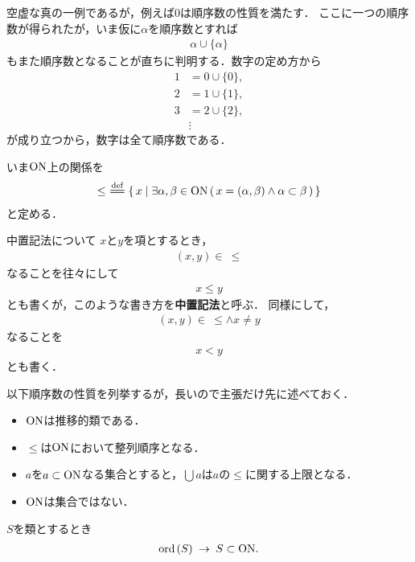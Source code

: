 	空虚な真の一例であるが，例えば$0$は順序数の性質を満たす．
	ここに一つの順序数が得られたが，いま仮に$\alpha$を順序数とすれば
	\begin{align}
		\alpha \cup \{\alpha\}
	\end{align}
	もまた順序数となることが直ちに判明する．数字の定め方から
	\begin{align}
		1 &= 0 \cup \{0\}, \\
		2 &= 1 \cup \{1\}, \\
		3 &= 2 \cup \{2\}, \\
		&\vdots
	\end{align}
	が成り立つから，数字は全て順序数である．
	
	いま$\mathrm{ON}$上の関係を
	\begin{align}
		\leq\ \defeq \Set{x}{\exists \alpha,\beta \in \ON\, 
		(\, x=(\alpha,\beta) \wedge \alpha \subset \beta\, )}
	\end{align}
	と定める．
		
	\begin{itembox}[l]{中置記法について}
		$x$と$y$を項とするとき，
		\begin{align}
			(x,y) \in\ \leq
		\end{align}
		なることを往々にして
		\begin{align}
			x \leq y
		\end{align}
		とも書くが，このような書き方を{\bf 中置記法}と呼ぶ．
		同様にして，
		\begin{align}
			(x,y) \in\ \leq \wedge x \neq y
		\end{align}
		なることを
		\begin{align}
			x < y
		\end{align}
		とも書く．
	\end{itembox}
	
	以下順序数の性質を列挙するが，長いので主張だけ先に述べておく．
	\begin{itemize}
		\item $\mathrm{ON}$は推移的類である．
		\item $\leq$は$\mathrm{ON}$において整列順序となる．
		\item $a$を$a \subset \mathrm{ON}$なる集合とすると，$\bigcup a$は$a$の$\leq$に関する上限となる．
		\item $\mathrm{ON}$は集合ではない．
	\end{itemize}
	
	\begin{screen}
		\begin{thm}
		\label{thm:transitive_totally_ordered_class_is_contained_in_ON}
			$S$を類とするとき
			\begin{align}
				\operatorname*{ord}\hspace{0.15em}(S) \hspace{0.25em}\rightarrow\hspace{0.25em} S \subset \mathrm{ON}.
			\end{align}
		\end{thm}
	\end{screen}
	
